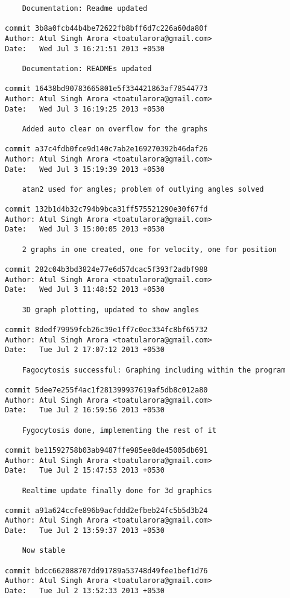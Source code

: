 \begin{lstlisting}
    Documentation: Readme updated

commit 3b8a0fcb44b4be72622fb8bff6d7c226a60da80f
Author: Atul Singh Arora <toatularora@gmail.com>
Date:   Wed Jul 3 16:21:51 2013 +0530

    Documentation: READMEs updated

commit 16438bd90783665801e5f334421863af78544773
Author: Atul Singh Arora <toatularora@gmail.com>
Date:   Wed Jul 3 16:19:25 2013 +0530

    Added auto clear on overflow for the graphs

commit a37c4fdb0fce9d140c7ab2e169270392b46daf26
Author: Atul Singh Arora <toatularora@gmail.com>
Date:   Wed Jul 3 15:19:39 2013 +0530

    atan2 used for angles; problem of outlying angles solved

commit 132b1d4b32c794b9bca31ff575521290e30f67fd
Author: Atul Singh Arora <toatularora@gmail.com>
Date:   Wed Jul 3 15:00:05 2013 +0530

    2 graphs in one created, one for velocity, one for position

commit 282c04b3bd3824e77e6d57dcac5f393f2adbf988
Author: Atul Singh Arora <toatularora@gmail.com>
Date:   Wed Jul 3 11:48:52 2013 +0530

    3D graph plotting, updated to show angles

commit 8dedf79959fcb26c39e1ff7c0ec334fc8bf65732
Author: Atul Singh Arora <toatularora@gmail.com>
Date:   Tue Jul 2 17:07:12 2013 +0530

    Fagocytosis successful: Graphing including within the program

commit 5dee7e255f4ac1f281399937619af5db8c012a80
Author: Atul Singh Arora <toatularora@gmail.com>
Date:   Tue Jul 2 16:59:56 2013 +0530

    Fygocytosis done, implementing the rest of it

commit be11592758b03ab9487ffe985ee8de45005db691
Author: Atul Singh Arora <toatularora@gmail.com>
Date:   Tue Jul 2 15:47:53 2013 +0530

    Realtime update finally done for 3d graphics

commit a91a624ccfe896b9acfddd2efbeb24fc5b5d3b24
Author: Atul Singh Arora <toatularora@gmail.com>
Date:   Tue Jul 2 13:59:37 2013 +0530

    Now stable

commit bdcc662088707dd91789a53748d49fee1bef1d76
Author: Atul Singh Arora <toatularora@gmail.com>
Date:   Tue Jul 2 13:52:33 2013 +0530


\end{lstlisting}
